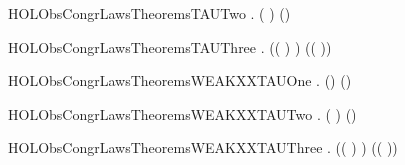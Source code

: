\newcommand{\HOLObsCongrLawsTheoremsTAUOne}{\UseVerbatim{HOLObsCongrLawsTheoremsTAUOne}}
\begin{SaveVerbatim}{HOLObsCongrLawsTheoremsTAUTwo}
\HOLTokenTurnstile{} \HOLSymConst{\HOLTokenForall{}}.  ( \HOLSymConst{+} \HOLConst{\ensuremath{\tau}}) (\HOLConst{\ensuremath{\tau}})
\end{SaveVerbatim}
\newcommand{\HOLObsCongrLawsTheoremsTAUTwo}{\UseVerbatim{HOLObsCongrLawsTheoremsTAUTwo}}
\begin{SaveVerbatim}{HOLObsCongrLawsTheoremsTAUThree}
\HOLTokenTurnstile{} \HOLSymConst{\HOLTokenForall{}}  .  (( \HOLSymConst{+} \HOLConst{\ensuremath{\tau}}) \HOLSymConst{+} ) (( \HOLSymConst{+} \HOLConst{\ensuremath{\tau}}))
\end{SaveVerbatim}
\newcommand{\HOLObsCongrLawsTheoremsTAUThree}{\UseVerbatim{HOLObsCongrLawsTheoremsTAUThree}}
\begin{SaveVerbatim}{HOLObsCongrLawsTheoremsWEAKXXTAUOne}
\HOLTokenTurnstile{} \HOLSymConst{\HOLTokenForall{}} .  (\HOLConst{\ensuremath{\tau}}) ()
\end{SaveVerbatim}
\newcommand{\HOLObsCongrLawsTheoremsWEAKXXTAUOne}{\UseVerbatim{HOLObsCongrLawsTheoremsWEAKXXTAUOne}}
\begin{SaveVerbatim}{HOLObsCongrLawsTheoremsWEAKXXTAUTwo}
\HOLTokenTurnstile{} \HOLSymConst{\HOLTokenForall{}}.  ( \HOLSymConst{+} \HOLConst{\ensuremath{\tau}}) (\HOLConst{\ensuremath{\tau}})
\end{SaveVerbatim}
\newcommand{\HOLObsCongrLawsTheoremsWEAKXXTAUTwo}{\UseVerbatim{HOLObsCongrLawsTheoremsWEAKXXTAUTwo}}
\begin{SaveVerbatim}{HOLObsCongrLawsTheoremsWEAKXXTAUThree}
\HOLTokenTurnstile{} \HOLSymConst{\HOLTokenForall{}}  .  (( \HOLSymConst{+} \HOLConst{\ensuremath{\tau}}) \HOLSymConst{+} ) (( \HOLSymConst{+} \HOLConst{\ensuremath{\tau}}))
\end{SaveVerbatim}
